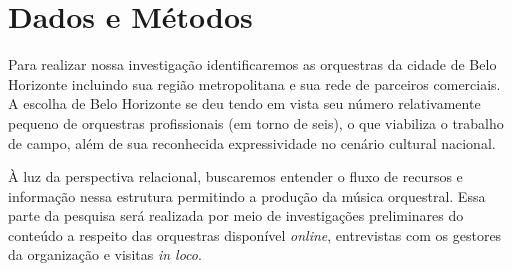 \documentclass[a4paper, 12pt, openright, oneside, german, french, english, brazil]{abntex2}
\begin{document}
	\section{Dados e Métodos}



	Para realizar nossa investigação identificaremos as orquestras da cidade de Belo Horizonte incluindo sua região metropolitana e sua rede de parceiros comerciais. A escolha de Belo Horizonte se deu tendo em vista seu número relativamente pequeno de orquestras profissionais (em torno de seis), o que viabiliza o trabalho de campo, além de sua reconhecida expressividade no cenário cultural nacional.



	À luz da perspectiva relacional, buscaremos entender o fluxo de recursos e informação nessa estrutura permitindo a produção da música orquestral. Essa parte da pesquisa será realizada por meio de investigações preliminares do conteúdo a respeito das orquestras disponível \textit{online}, entrevistas com os gestores da organização e visitas \textit{in loco}.
\end{document}
